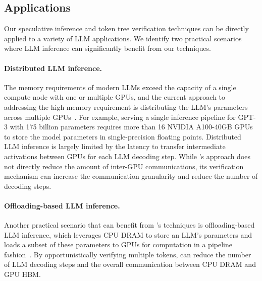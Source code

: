 \subsection{Applications}
\label{subsec:application}
Our speculative inference and token tree verification techniques can be directly applied to a variety of LLM applications. We identify two practical scenarios where LLM inference can significantly benefit from our techniques.

\paragraph{Distributed LLM inference.} 
The memory requirements of modern LLMs exceed the capacity of a single compute node with one or multiple GPUs, and the current approach to addressing the high memory requirement is distributing the LLM's parameters across multiple GPUs~\cite{miao2023spotserve}.
For example, serving a single inference pipeline for GPT-3 with 175 billion parameters requires more than 16 NVIDIA A100-40GB GPUs to store the model parameters in single-precision floating points.
Distributed LLM inference is largely limited by the latency to transfer intermediate activations between GPUs for each LLM decoding step. 
While \Sys's approach does not directly reduce the amount of inter-GPU communications, its verification mechanism can increase the communication granularity and reduce the number of decoding steps.


\paragraph{Offloading-based LLM inference.}
Another practical scenario that can benefit from \Sys's techniques is offloading-based LLM inference, which leverages 
CPU DRAM to store an LLM's parameters and loads a subset of these parameters to GPUs for computation in a pipeline fashion~\cite{sheng2023highthroughput}.
By opportunistically verifying multiple tokens, \Sys can reduce the number of LLM decoding steps and the overall communication between CPU DRAM and GPU HBM.